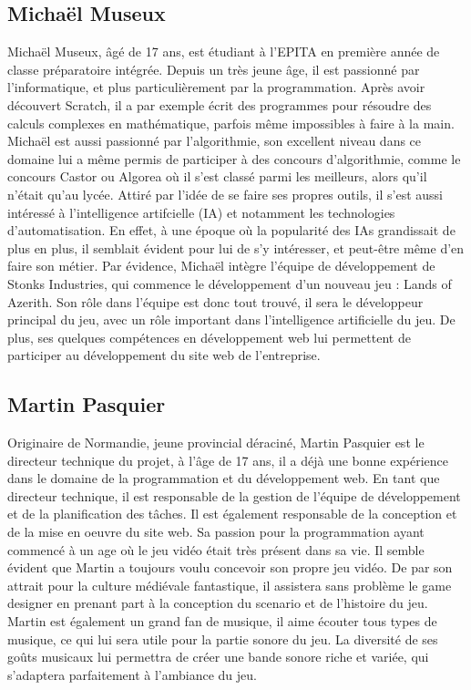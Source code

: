 \subsection*{Michaël Museux}
Michaël Museux, âgé de 17 ans, est étudiant à l'EPITA en première année de classe
préparatoire intégrée. Depuis un très jeune âge, il est passionné par l'informatique, et plus
particulièrement par la programmation. Après avoir découvert Scratch, il a par exemple
écrit des programmes pour résoudre des calculs complexes en mathématique, parfois même
impossibles à faire à la main. Michaël est aussi passionné par l'algorithmie, son excellent
niveau dans ce domaine lui a même permis de participer à des concours d'algorithmie, comme
le concours Castor ou Algorea où il s'est classé parmi les meilleurs, alors qu'il n'était qu'au
lycée. Attiré par l'idée de se faire ses propres outils, il s'est aussi intéressé à l'intelligence
artifcielle (IA) et notamment les technologies d'automatisation. En effet, à une époque où la
popularité des IAs grandissait de plus en plus, il semblait évident pour lui de s'y intéresser,
et peut-être même d'en faire son métier.
Par évidence, Michaël intègre l'équipe de développement de Stonks Industries, qui commence
le développement d'un nouveau jeu : Lands of Azerith. Son rôle dans l'équipe est donc tout
trouvé, il sera le développeur principal du jeu, avec un rôle important dans l'intelligence
artificielle du jeu. De plus, ses quelques compétences en développement web lui permettent
de participer au développement du site web de l'entreprise.
\\

\subsection*{Martin Pasquier}
Originaire de Normandie, jeune provincial déraciné, Martin Pasquier est le directeur technique du projet, à l'âge de 17 ans, il a déjà une
bonne expérience dans le domaine de la programmation et du développement web. En tant
que directeur technique, il est responsable de la gestion de l'équipe de développement et de la
planification des tâches. Il est également responsable de la conception et de la mise en oeuvre
du site web.
Sa passion pour la programmation ayant commencé à un age où le jeu vidéo était très
présent dans sa vie. Il semble évident que Martin a toujours voulu concevoir son propre jeu
vidéo. De par son attrait pour la culture médiévale fantastique, il assistera sans problème le
game designer en prenant part à la conception du scenario et de l'histoire du jeu.
Martin est également un grand fan de musique, il aime écouter tous types de musique, ce
qui lui sera utile pour la partie sonore du jeu. La diversité de ses goûts musicaux lui permettra
de créer une bande sonore riche et variée, qui s'adaptera parfaitement à l'ambiance du jeu.


